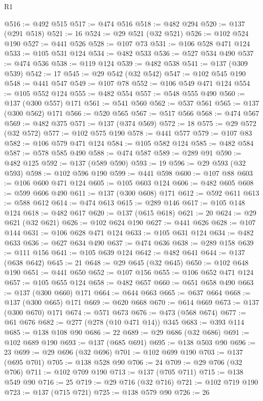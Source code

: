 \begin{lexlean}{R1}
\begin{coremodule}
{{{{{{{{{{{{{{{{{{{{{{{{{{{{{{{{{{{{{{{{{{{{{{{{{{{{{{{{{{{{{{{{{{{{{{{{{{{{{{{{{{{{{{{{{{@516 := @492 @515
@517 := @474 @516
@518 := @482 @294
@520 := @137 (@291 @518)
@521 := 16
@524 := @29 @521 (@32 @521)
@526 := @102 @524 @190
@527 := @441 @526
@528 := @107 @73
@531 := @106 @528 @471 @124
@533 := @105 @531 @124
@534 := @482 @533
@536 := @527 @534 @490
@537 := @474 @536
@538 := @119 @124
@539 := @482 @538
@541 := @137 (@309 @539)
@542 := 17
@545 := @29 @542 (@32 @542)
@547 := @102 @545 @190
@548 := @441 @547
@549 := @107 @78
@552 := @106 @549 @471 @124
@554 := @105 @552 @124
@555 := @482 @554
@557 := @548 @555 @490
@560 := @137 (@300 @557) @171
@561 := @541 @560
@562 := @537 @561
@565 := @137 (@300 @562) @171
@566 := @520 @565
@567 := @517 @566
@568 := @474 @567
@569 := @482 @375
@571 := @137 (@374 @569)
@572 := 18
@575 := @29 @572 (@32 @572)
@577 := @102 @575 @190
@578 := @441 @577
@579 := @107 @83
@582 := @106 @579 @471 @124
@584 := @105 @582 @124
@585 := @482 @584
@587 := @578 @585 @490
@588 := @474 @587
@589 := @289 @91
@590 := @482 @125
@592 := @137 (@589 @590)
@593 := 19
@596 := @29 @593 (@32 @593)
@598 := @102 @596 @190
@599 := @441 @598
@600 := @107 @88
@603 := @106 @600 @471 @124
@605 := @105 @603 @124
@606 := @482 @605
@608 := @599 @606 @490
@611 := @137 (@300 @608) @171
@612 := @592 @611
@613 := @588 @612
@614 := @474 @613
@615 := @289 @146
@617 := @105 @148 @124
@618 := @482 @617
@620 := @137 (@615 @618)
@621 := 20
@624 := @29 @621 (@32 @621)
@626 := @102 @624 @190
@627 := @441 @626
@628 := @107 @144
@631 := @106 @628 @471 @124
@633 := @105 @631 @124
@634 := @482 @633
@636 := @627 @634 @490
@637 := @474 @636
@638 := @289 @158
@639 := @111 @156
@641 := @105 @639 @124
@642 := @482 @641
@644 := @137 (@638 @642)
@645 := 21
@648 := @29 @645 (@32 @645)
@650 := @102 @648 @190
@651 := @441 @650
@652 := @107 @156
@655 := @106 @652 @471 @124
@657 := @105 @655 @124
@658 := @482 @657
@660 := @651 @658 @490
@663 := @137 (@300 @660) @171
@664 := @644 @663
@665 := @637 @664
@668 := @137 (@300 @665) @171
@669 := @620 @668
@670 := @614 @669
@673 := @137 (@300 @670) @171
@674 := @571 @673
@676 := @473 (@568 @674)
@677 := @61 @676
@682 := @277 (@278 (@10 @471 @14)) @345
@683 := @393 @114
@685 := @138 @108 @90
@686 := 22
@689 := @29 @686 (@32 @686)
@691 := @102 @689 @190
@693 := @137 (@685 @691)
@695 := @138 @503 @90
@696 := 23
@699 := @29 @696 (@32 @696)
@701 := @102 @699 @190
@703 := @137 (@695 @701)
@705 := @138 @528 @90
@706 := 24
@709 := @29 @706 (@32 @706)
@711 := @102 @709 @190
@713 := @137 (@705 @711)
@715 := @138 @549 @90
@716 := 25
@719 := @29 @716 (@32 @716)
@721 := @102 @719 @190
@723 := @137 (@715 @721)
@725 := @138 @579 @90
@726 := 26
}}}}}}}}}}}}}}}}}}}}}}}}}}}}}}}}}}}}}}}}}}}}}}}}}}}}}}}}}}}}}}}}}}}}}}}}}}}}}}}}}}}}}}}}}}
\end{coremodule}
\end{lexlean}
